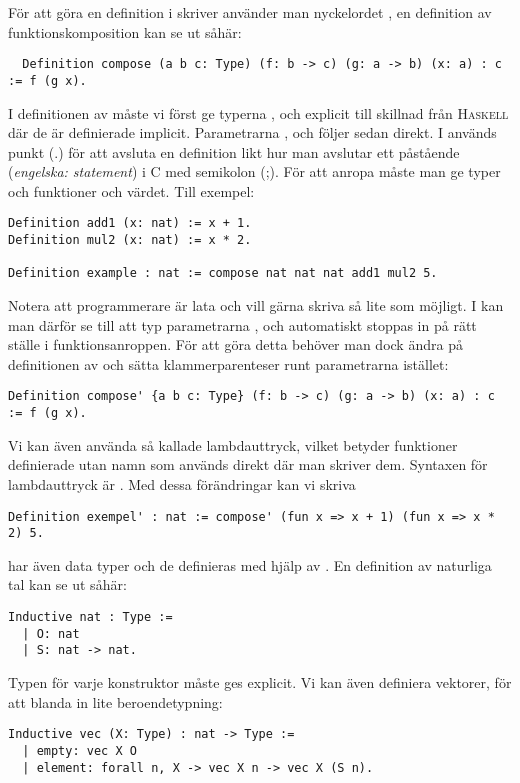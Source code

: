 För att göra en definition i \coq skriver använder man nyckelordet
, en definition av funktionskomposition kan se ut såhär:
\begin{lstlisting}
  Definition compose (a b c: Type) (f: b -> c) (g: a -> b) (x: a) : c := f (g x).
\end{lstlisting}
I definitionen av  måste vi först ge typerna ,  och 
explicit till skillnad från \textsc{Haskell} där de är definierade implicit.
Parametrarna ,  och  följer sedan direkt. I \coq används punkt
(.) för att avsluta en definition likt hur man avslutar ett påstående
(\emph{engelska: statement}) i C med semikolon (;). För att anropa 
måste man ge typer och funktioner och värdet. Till exempel:
\begin{lstlisting}
Definition add1 (x: nat) := x + 1.
Definition mul2 (x: nat) := x * 2.

Definition example : nat := compose nat nat nat add1 mul2 5.
\end{lstlisting}
Notera att programmerare är lata och vill gärna skriva så lite som möjligt. I
\coq kan man därför se till att typ parametrarna ,  och 
automatiskt stoppas in på rätt ställe i funktionsanroppen. För att göra detta
behöver man dock ändra på definitionen av  och sätta
klammerparenteser runt parametrarna istället:
\begin{lstlisting}
Definition compose' {a b c: Type} (f: b -> c) (g: a -> b) (x: a) : c := f (g x).
\end{lstlisting}
Vi kan även använda så kallade lambdauttryck, vilket betyder funktioner
definierade utan namn som används direkt där man skriver dem. Syntaxen för
lambdauttryck är . Med dessa förändringar kan
vi skriva
\begin{lstlisting}
Definition exempel' : nat := compose' (fun x => x + 1) (fun x => x * 2) 5.
\end{lstlisting}
\coq har även data typer och de definieras med hjälp av . En definition
av naturliga tal kan se ut såhär:
\begin{lstlisting}
Inductive nat : Type :=
  | O: nat
  | S: nat -> nat.
\end{lstlisting}
Typen för varje konstruktor måste ges explicit. Vi kan även definiera vektorer, för
att blanda in lite beroendetypning:
\begin{lstlisting}
Inductive vec (X: Type) : nat -> Type :=
  | empty: vec X O
  | element: forall n, X -> vec X n -> vec X (S n).
\end{lstlisting}
